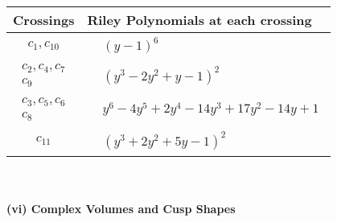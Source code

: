 \documentclass[1p]{elsarticle_modified}
\theoremstyle{definition}
\begin{document}
\begin{tabular}{m{50pt}|m{274pt}}
Crossings & \hspace{64pt}Riley Polynomials at each crossing \\
\hline $$\begin{aligned}c_{1},c_{10}\end{aligned}$$&$\begin{aligned}
&(y-1)^6
\end{aligned}$\\
\hline $$\begin{aligned}c_{2},c_{4},c_{7}\\c_{9}\end{aligned}$$&$\begin{aligned}
&(y^3-2 y^2+y-1)^2
\end{aligned}$\\
\hline $$\begin{aligned}c_{3},c_{5},c_{6}\\c_{8}\end{aligned}$$&$\begin{aligned}
&y^6-4 y^5+2 y^4-14 y^3+17 y^2-14 y+1
\end{aligned}$\\
\hline $$\begin{aligned}c_{11}\end{aligned}$$&$\begin{aligned}
&(y^3+2 y^2+5 y-1)^2
\end{aligned}$\\
\hline
\end{tabular}\\~\\
\newpage\flushleft \textbf{(vi) Complex Volumes and Cusp Shapes}
\end{document}
